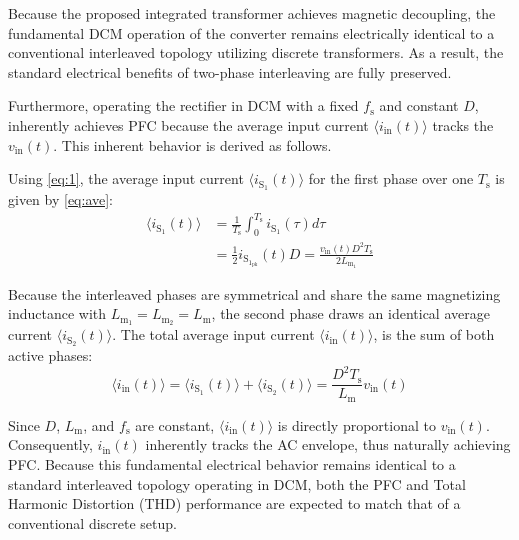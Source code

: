 \documentclass[lettersize,journal]{IEEEtran}
\begin{document}
{\color{red} Because the proposed integrated transformer achieves magnetic decoupling, the fundamental DCM operation of the converter remains electrically identical to a conventional interleaved topology utilizing discrete transformers. As a result, the standard electrical benefits of two-phase interleaving are fully preserved.

Furthermore, operating the rectifier in DCM with a fixed $f_{\mathrm{s}}$ and constant $D$, inherently achieves PFC because the average input current $\langle i_{\mathrm{in}}(t) \rangle$ tracks the $v_{\mathrm{in}}(t)$. This inherent behavior is derived as follows.

Using \eqref{eq:1}, the average input current $\langle i_\mathrm{S_1}(t) \rangle$ for the first phase over one $T_\mathrm{s}$ is given by \eqref{eq:ave}:
\begin{align}
    \label{eq:ave}
\langle i_\mathrm{S_1}(t) \rangle &= \frac{1}{T_\mathrm{s}}\int_{0}^{T_\mathrm{s}}i_\mathrm{S_1}(\tau)d\tau \nonumber \\ &= \frac{1}{2} i_{\mathrm{S}_{1_{\mathrm{pk}}}}(t) D = \frac{v_{\mathrm{in}}(t) D^2 T_{\mathrm{s}}}{2 L_{\mathrm{m}_1}} 
\end{align}

Because the interleaved phases are symmetrical and share the same magnetizing inductance with $L_{\mathrm{m}_1} = L_{\mathrm{m}_2} = L_{\mathrm{m}}$, the second phase draws an identical average current $\langle i_{\mathrm{S}_2}(t) \rangle$. The total average input current $\langle i_{\mathrm{in}}(t) \rangle$, is the sum of both active phases:
\begin{equation}
\langle i_{\mathrm{in}}(t) \rangle = \langle i_{\mathrm{S}_1}(t) \rangle + \langle i_{\mathrm{S}_2}(t) \rangle = \frac{D^2 T_{\mathrm{s}}}{L_{\mathrm{m}}} v_{\mathrm{in}}(t)
\end{equation}

Since $D$, $L_{\mathrm{m}}$, and $f_{\mathrm{s}}$ are constant, $\langle i_{\mathrm{in}}(t) \rangle$ is directly proportional to $v_{\mathrm{in}}(t)$. Consequently, $ i_{\mathrm{in}}(t)$ inherently tracks the AC envelope, thus naturally achieving PFC. Because this fundamental electrical behavior remains identical to a standard interleaved topology operating in DCM, both the PFC and Total Harmonic Distortion (THD) performance are expected to match that of a conventional discrete setup.
}
\end{document}
